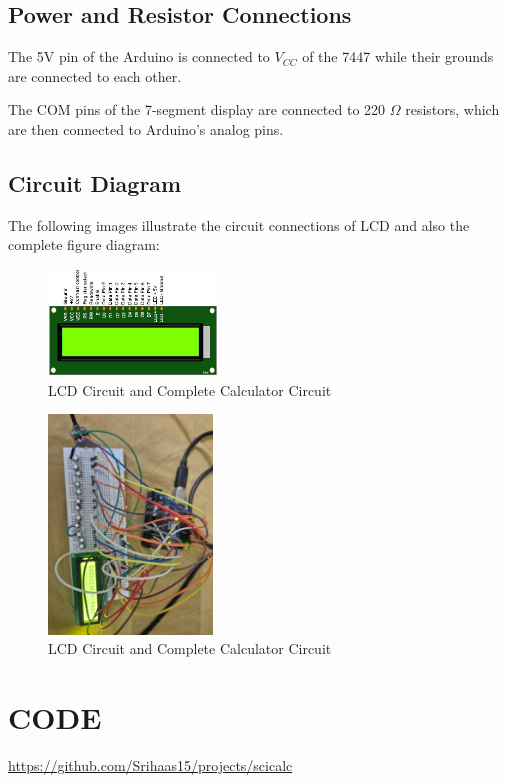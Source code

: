 \documentclass{article}
\begin{document}
\subsection{Power and Resistor Connections}
The 5V pin of the Arduino is connected to $V_{CC}$ of the 7447 while their grounds are connected to each other.

The COM pins of the 7-segment display are connected to 220 $\Omega$ resistors, which are then connected to Arduino's analog pins.

\subsection{Circuit Diagram}
The following images illustrate the circuit connections of LCD and also the complete figure diagram:

\begin{figure}[h]
    \centering
    \includegraphics[width=0.4\textwidth]{fig/lcd.jpeg}   
    \caption{LCD Circuit and Complete Calculator Circuit}
\end{figure}

\begin{figure}[h]
    \centering
    \includegraphics[width=0.39\textwidth]{fig/calculator.png}
    \caption{LCD Circuit and Complete Calculator Circuit}
\end{figure}

\section{CODE}
\href{https://github.com/Srihaas15/projects/tree/35e70ce5d2bdd1bc1f3b9c4a293cc7d73a92357/scicalc}{https://github.com/Srihaas15/projects/scicalc}
\end{document}
